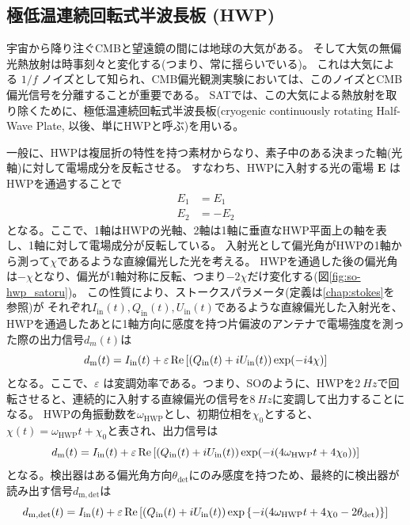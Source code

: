\documentclass[../../main.tex]{subfiles}
\begin{document}
\subsection{極低温連続回転式半波長板 (HWP)}
\label{sec:HWP}
宇宙から降り注ぐCMBと望遠鏡の間には地球の大気がある。
そして大気の無偏光熱放射は時事刻々と変化する(つまり、常に揺らいでいる)。
これは大気による $1/f$ ノイズとして知られ、CMB偏光観測実験においては、このノイズとCMB偏光信号を分離することが重要である。
SATでは、この大気による熱放射を取り除くために、極低温連続回転式半波長板(cryogenic continuously rotating Half-Wave Plate, 以後、単にHWPと呼ぶ)を用いる。\cite{so:hwp_yamada}

一般に、HWPは複屈折の特性を持つ素材からなり、素子中のある決まった軸(光軸)に対して電場成分を反転させる。
すなわち、HWPに入射する光の電場 $\bm{E}$ はHWPを通過することで
\begin{align}
    E_{1} &= E_{1} \\
    E_{2} &= -E_{2}
\end{align}
となる。ここで、1軸はHWPの光軸、2軸は1軸に垂直なHWP平面上の軸を表し、1軸に対して電場成分が反転している。
入射光として偏光角がHWPの1軸から測って$\chi$であるような直線偏光した光を考える。
HWPを通過した後の偏光角は$-\chi$となり、偏光が1軸対称に反転、つまり$-2\chi$だけ変化する(図\ref{fig:so-hwp_satoru})。
この性質により、ストークスパラメータ(定義は\ref{chap:stokes}を参照)が
それぞれ$I_{\mathrm{in}}(t), Q_{\mathrm{in}}(t), U_{\mathrm{in}}(t)$であるような直線偏光した入射光を、
HWPを通過したあとに1軸方向に感度を持つ片偏波のアンテナで電場強度を測った際の出力信号$d_m(t)$は
\begin{equation}
    d_{\mathrm{m}}(t) = I_{\mathrm{in}}(t) + \varepsilon\Re\qty[\qty(Q_{\mathrm{in}}(t)+iU_{\mathrm{in}}(t))\exp(-i 4\chi)]
\end{equation}
となる。ここで、$\varepsilon$ は変調効率である。つまり、SOのように、HWPを$\SI{2}{Hz}$で回転させると、連続的に入射する直線偏光の信号を$\SI{8}{Hz}$に変調して出力することになる。
HWPの角振動数を$\omega_{\mathrm{HWP}}$とし、初期位相を$\chi_0$とすると、$\chi(t) = \omega_{\mathrm{HWP}}t + \chi_{0}$と表され、出力信号は
\begin{equation}
    d_{\mathrm{m}}(t) = I_{\mathrm{in}}(t) + \varepsilon\Re\qty[\qty(Q_{\mathrm{in}}(t)+iU_{\mathrm{in}}(t))\exp(-i \qty(4\omega_{\mathrm{HWP}}t + 4\chi_0))]
\end{equation}
となる。検出器はある偏光角方向$\theta_{\mathrm{det}}$にのみ感度を持つため、最終的に検出器が読み出す信号$d_{\mathrm{m}, \mathrm{det}}$は
\begin{equation}
    \label{eq:so-hwp_modulation}
    d_{\mathrm{m}, \mathrm{det}}(t) = I_{\mathrm{in}}(t) + \varepsilon\Re\qty[\qty(Q_{\mathrm{in}}(t)+iU_{\mathrm{in}}(t))\exp\qty{-i \qty(4\omega_{\mathrm{HWP}}t + 4\chi_0 - 2\theta_{\mathrm{det}})}]
\end{equation}
\end{document}
